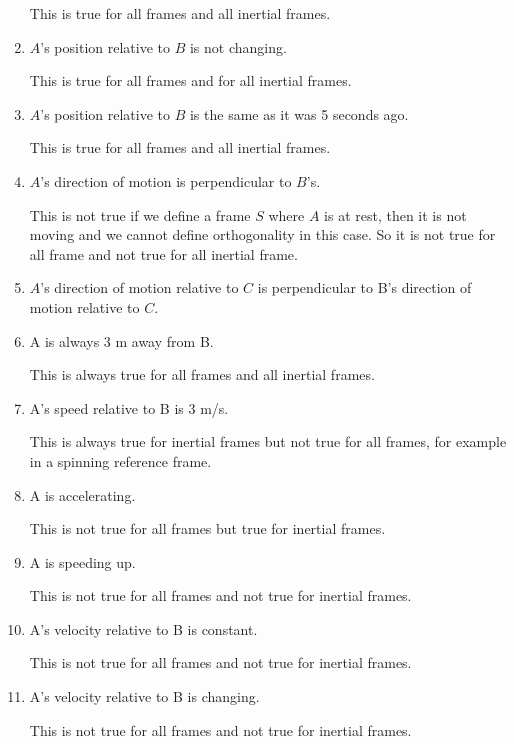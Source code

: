 \documentclass[12pt]{article}
\begin{document}
\begin{enumerate}
    This is true for all frames and all inertial frames.

    \item $A$'s position relative to $B$ is not changing. 

    This is true for all frames and for all inertial frames. 

    \item $A$’s position relative to $B$ is the same as it was 5 seconds ago.

    This is true for all frames and all inertial frames. 

    \item $A$’s direction of motion is perpendicular to $B$’s.

    This is not true if we define a frame $S$ where $A$ is at rest, then it is not moving and we cannot define orthogonality in this case. So it is not true for all frame and not true for all inertial frame. 

    \item $A$’s direction of motion relative to $C$ is perpendicular to B’s direction of motion relative to $C$.

    \item A is always 3 m away from B.
    
    This is always true for all frames and all inertial frames. 

    \item A’s speed relative to B is 3 m/s.
    
    This is always true for inertial frames but not true for all frames, for example in a spinning reference frame.

    \item A is accelerating.
    
    This is not true for all frames but true for inertial frames.

    \item A is speeding up.
    
    This is not true for all frames and not true for inertial frames.

    \item A’s velocity relative to B is constant.
    
    This is not true for all frames and not true for inertial frames.

    \item A’s velocity relative to B is changing.
    
    This is not true for all frames and not true for inertial frames.


\end{enumerate}
\end{document}
